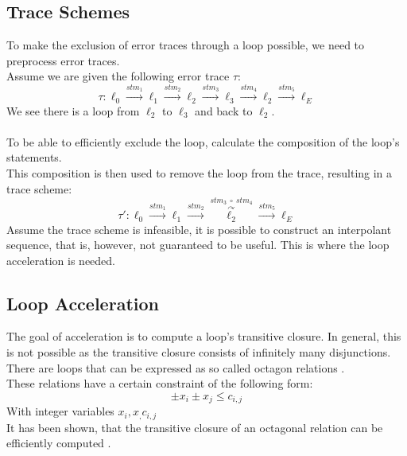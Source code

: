 \documentclass{article}
\begin{document}
\subsection{Trace Schemes}
To make the exclusion of error traces through a loop possible, we need to preprocess error traces. \\
Assume we are given the following error trace $\tau$:
\begin{equation*}
\tau: \ell_0 \xrightarrow{\text{$stm_1$}} \ell_1 \xrightarrow{\text{$stm_2$}} \ell_2 \xrightarrow{\text{$stm_3$}} \ell_3 \xrightarrow{\text{$stm_4$}} \ell_2 \xrightarrow{\text{$stm_5$}} \ell_E
\end{equation*}
We see there is a loop from $\ell_2$ to $\ell_3$ and back to $\ell_2$.  \\ \\
To be able to efficiently exclude the loop, calculate the composition of the loop's statements. \\
This composition is then used to remove the loop from the trace, resulting in a trace scheme:
\begin{equation*}
\tau':\ell_0 \xrightarrow{\text{$stm_1$}} \ell_1 \xrightarrow{\text{$stm_2$}} \overset{stm_3\ \circ \ stm_4}{\overset{\curvearrowright}{\ell_2}} \xrightarrow{\text{$stm_5$}} \ell_E
\end{equation*}
Assume the trace scheme is infeasible, it is possible to construct an interpolant sequence, that is,
however, not guaranteed to be useful. This is where the loop acceleration is needed.

\subsection{Loop Acceleration}
The goal of acceleration is to compute a loop's transitive closure. In general, this is not possible as the transitive closure consists of infinitely many disjunctions. There are loops that can be expressed as so called octagon relations \cite{DBLP:journals/corr/abs-cs-0703084}. \\
These relations have a certain constraint of the following form: 
\begin{equation*}
	\pm x_i \pm x_j \leq c_{i,j}
\end{equation*}
With integer variables $x_i, x_, c_{i,j}$ \\
It has been shown, that the transitive closure of an octagonal relation can be efficiently computed \cite{10.1007/978-3-642-14295-6_23}.
\end{document}
